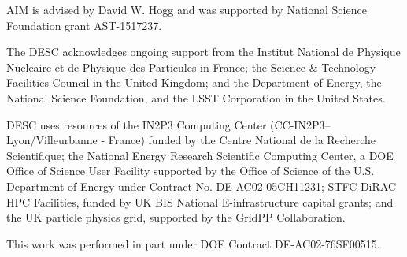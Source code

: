 \documentclass[\docopts]{\docclass}
\begin{document}





AIM is advised by David W. Hogg and was supported by National Science Foundation grant AST-1517237.



The DESC acknowledges ongoing support from the Institut National de Physique Nucleaire et de Physique des Particules in France; the Science \& Technology Facilities Council in the United Kingdom; and the Department of Energy, the National Science Foundation, and the LSST Corporation in the United States.

DESC uses resources of the IN2P3 Computing Center (CC-IN2P3--Lyon/Villeurbanne - France) funded by the Centre National de la Recherche Scientifique; the National Energy Research Scientific Computing Center, a DOE Office of Science User Facility supported by the Office of Science of the U.S. Department of Energy under Contract No. DE-AC02-05CH11231; STFC DiRAC HPC Facilities, funded by UK BIS National E-infrastructure capital grants; and the UK particle physics grid, supported by the GridPP Collaboration.

This work was performed in part under DOE Contract DE-AC02-76SF00515.




\end{document}
